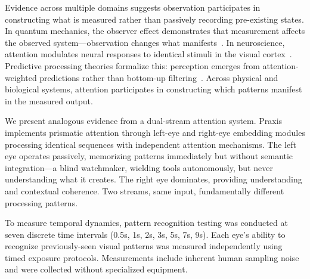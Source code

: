 \documentclass{article}
\begin{document}
Evidence across multiple domains suggests observation participates in constructing what is measured rather than passively recording pre-existing states. In quantum mechanics, the observer effect demonstrates that measurement affects the observed system—observation changes what manifests~\cite{heisenberg1927uncertainty}. In neuroscience, attention modulates neural responses to identical stimuli in the visual cortex~\cite{treue1996attentional,kastner2000mechanisms}. Predictive processing theories formalize this: perception emerges from attention-weighted predictions rather than bottom-up filtering~\cite{friston2010free,clark2013whatever}. Across physical and biological systems, attention participates in constructing which patterns manifest in the measured output.

We present analogous evidence from a dual-stream attention system. Praxis implements prismatic attention through left-eye and right-eye embedding modules processing identical sequences with independent attention mechanisms. The left eye operates passively, memorizing patterns immediately but without semantic integration—a blind watchmaker, wielding tools autonomously, but never understanding what it creates. The right eye dominates, providing understanding and contextual coherence. Two streams, same input, fundamentally different processing patterns.

To measure temporal dynamics, pattern recognition testing was conducted at seven discrete time intervals (0.5s, 1s, 2s, 3s, 5s, 7s, 9s). Each eye's ability to recognize previously-seen visual patterns was measured independently using timed exposure protocols. Measurements include inherent human sampling noise and were collected without specialized equipment.
\end{document}
